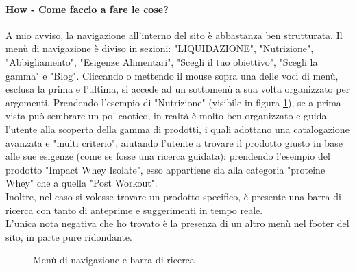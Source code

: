 \paragraph{How - Come faccio a fare le cose?}
\label{paragraph:how}
A mio avviso, la navigazione all'interno del sito è abbastanza ben strutturata. Il menù di navigazione è diviso in sezioni: "LIQUIDAZIONE", "Nutrizione", "Abbigliamento", "Esigenze Alimentari", "Scegli il tuo obiettivo", "Scegli la gamma" e "Blog".
Cliccando o mettendo il mouse sopra una delle voci di menù, esclusa la prima e l'ultima, si accede ad un sottomenù a sua volta organizzato per argomenti. Prendendo l'esempio di "Nutrizione"  (visibile in figura \ref{fig:figura4}), se a prima vista può sembrare un po' caotico, in realtà è molto ben organizzato e guida l'utente alla scoperta della gamma di prodotti, i quali adottano una catalogazione avanzata e "multi criterio", aiutando l'utente a trovare il prodotto giusto in base alle sue esigenze (come se fosse una ricerca guidata): prendendo l'esempio del prodotto "Impact Whey Isolate", esso appartiene sia alla categoria "proteine Whey" che a quella "Post Workout". \\Inoltre, nel caso si volesse trovare un prodotto specifico, è presente una barra di ricerca con tanto di anteprime e suggerimenti in tempo reale.\\L'unica nota negativa che ho trovato è la presenza di un altro menù nel footer del sito, in parte pure ridondante.
\begin{figure}[!htb]
	\caption{\label{fig:figura4} Menù di navigazione e barra di ricerca}
\end{figure}
